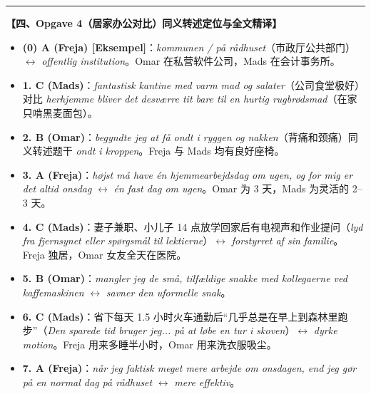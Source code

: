 \begin{answerbox}
\vspace{0.45em}
\hrule
\vspace{0.45em}
\textbf{\color{NCDNavy}【四、Opgave 4（居家办公对比）同义转述定位与全文精译】}
\begin{itemize}
  \item \textbf{(0) A (Freja) [Eksempel]}：\textit{kommunen / på rådhuset}（市政厅公共部门）$\leftrightarrow$ \textit{offentlig institution}。Omar 在私营软件公司，Mads 在会计事务所。
  \item \textbf{1. C (Mads)}：\textit{fantastisk kantine med varm mad og salater}（公司食堂极好）对比 \textit{herhjemme bliver det desværre tit bare til en hurtig rugbrødsmad}（在家只啃黑麦面包）。
  \item \textbf{2. B (Omar)}：\textit{begyndte jeg at få ondt i ryggen og nakken}（背痛和颈痛）同义转述题干 \textit{ondt i kroppen}。Freja 与 Mads 均有良好座椅。
  \item \textbf{3. A (Freja)}：\textit{højst må have én hjemmearbejdsdag om ugen, og for mig er det altid onsdag} $\leftrightarrow$ \textit{én fast dag om ugen}。Omar 为 3 天，Mads 为灵活的 2--3 天。
  \item \textbf{4. C (Mads)}：妻子兼职、小儿子 14 点放学回家后有电视声和作业提问（\textit{lyd fra fjernsynet eller spørgsmål til lektierne}）$\leftrightarrow$ \textit{forstyrret af sin familie}。Freja 独居，Omar 女友全天在医院。
  \item \textbf{5. B (Omar)}：\textit{mangler jeg de små, tilfældige snakke med kollegaerne ved kaffemaskinen} $\leftrightarrow$ \textit{savner den uformelle snak}。
  \item \textbf{6. C (Mads)}：省下每天 1.5 小时火车通勤后“几乎总是在早上到森林里跑步”（\textit{Den sparede tid bruger jeg... på at løbe en tur i skoven}）$\leftrightarrow$ \textit{dyrke motion}。Freja 用来多睡半小时，Omar 用来洗衣服吸尘。
  \item \textbf{7. A (Freja)}：\textit{når jeg faktisk meget mere arbejde om onsdagen, end jeg gør på en normal dag på rådhuset} $\leftrightarrow$ \textit{mere effektiv}。
\end{itemize}


\end{answerbox}
